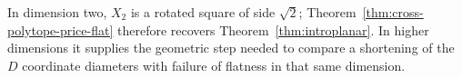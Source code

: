 In dimension two, $X_2$ is a rotated square of side $\sqrt2$;
Theorem~\ref{thm:cross-polytope-price-flat} therefore recovers
Theorem~\ref{thm:introplanar}. In higher dimensions it supplies the
geometric step needed to compare a shortening of the $D$ coordinate
diameters with failure of flatness in that same dimension.
